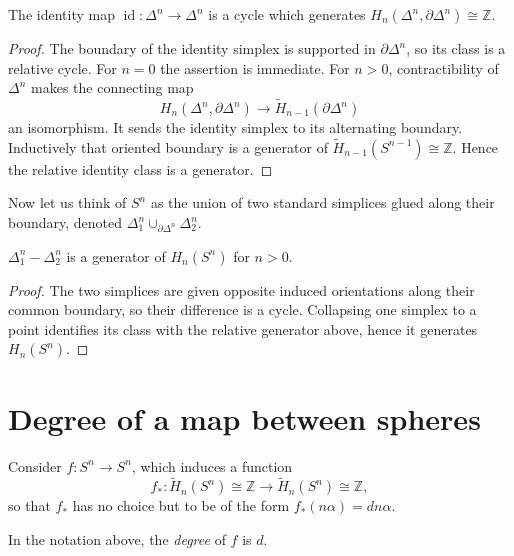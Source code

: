 \begin{proposition}
The identity map
$\operatorname{id}:\Delta^n\to\Delta^n$
is a cycle which
generates
$H_n(\Delta^n,\partial\Delta^n)
\cong\mathbb{Z}$.
\begin{proof}
The boundary of the identity simplex is
supported in $\partial\Delta^n$, so its class
is a relative cycle. For $n=0$ the assertion
is immediate. For $n>0$, contractibility of
$\Delta^n$ makes the connecting map
$$
H_n(\Delta^n,\partial\Delta^n)
\longrightarrow
\tilde H_{n-1}(\partial\Delta^n)
$$
an isomorphism. It sends the identity simplex
to its alternating boundary. Inductively that
oriented boundary is a generator of
$\tilde H_{n-1}(S^{n-1})\cong\mathbb{Z}$.
Hence the relative identity class is a
generator.
\end{proof}
\end{proposition}

Now let us think of $S^n$ as the union of two
standard
simplices glued along their boundary, denoted
$\Delta_1^n\cup_{\partial\Delta^n}
\Delta_2^n$.

\begin{proposition}
$\Delta^n_1-\Delta^n_2$ is a generator of
$H_n(S^n)$ for
$n>0$.
\begin{proof}
The two simplices are given opposite induced
orientations along their common boundary, so
their difference is a cycle. Collapsing one
simplex to a point identifies its class with
the relative generator above, hence it
generates $H_n(S^n)$.
\end{proof}
\end{proposition}
\section{Degree of a map between spheres}
\label{section-degree-sphere-maps}

Consider $f:S^n\to S^n$, which induces a
function
$$
f_*:\tilde H_n(S^n)\cong\mathbb{Z}
\to
\tilde H_n(S^n)\cong\mathbb{Z},
$$
so that $f_*$ has no choice but to be of the
form
$f_*(n\alpha)=dn\alpha$.

\begin{definition}
In the notation above, the \emph{degree} of
$f$ is $d$.
\end{definition}

